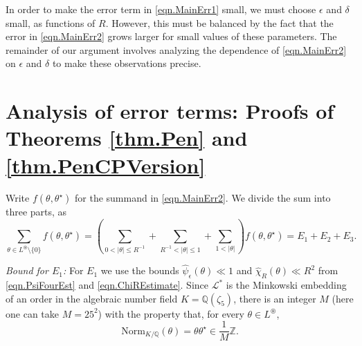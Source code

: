 \documentclass[reqno]{amsart}
\newcommand{\Z}{\mathbb{Z}}
\newcommand{\Q}{\mathbb{Q}}
\newcommand{\cL}{\mathcal{L}}
\begin{document}
In order to make the error term in \eqref{eqn.MainErr1} small, we must choose $\epsilon$ and $\delta$ small, as functions of $R$. However, this must be balanced by the fact that the error in \eqref{eqn.MainErr2} grows larger for small values of these parameters. The remainder of our argument involves analyzing the dependence of \eqref{eqn.MainErr2} on $\epsilon$ and $\delta$ to make these observations precise.

\section{Analysis of error terms: Proofs of Theorems \ref{thm.Pen} and \ref{thm.PenCPVersion}}\label{sec.PenProof}

Write $f(\theta,\theta^\star)$ for the summand in \eqref{eqn.MainErr2}. We divide the sum into three parts, as
\[\sum_{\theta\in L^\circledast\setminus\{0\}}f(\theta,\theta^\star)=\left(\sum_{0<|\theta|\le R^{-1}}+\sum_{R^{-1}<|\theta|\le 1}+\sum_{1<|\theta|}\right)f(\theta,\theta^\star)=E_1+E_2+E_3.\]

\noindent\emph{Bound for $E_1$:} For $E_1$ we use the bounds $\widehat{\psi}_\epsilon(\theta)\ll 1$ and $\widehat{\chi}_R(\theta)\ll R^2$ from \eqref{eqn.PsiFourEst} and \eqref{eqn.ChiREstimate}. Since $\cL^*$ is the Minkowski embedding of an order in the algebraic number field $K=\Q(\zeta_5)$, there is an integer $M$ (here one can take $M=25^2$) with the property that, for every $\theta\in L^\circledast$,
\begin{equation}\label{eqn.MChoice}
	\mathrm{Norm}_{K/\Q}(\theta)=\theta\theta^\star\in\frac{1}{M}\Z.
\end{equation}
\end{document}
